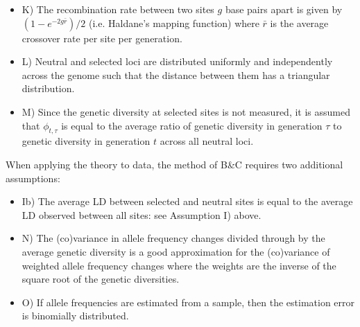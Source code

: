 \documentclass[12pt]{article}
\begin{document}
\begin{bibunit}
\begin{itemize}
\item K) The recombination rate between two sites $g$ base pairs apart is given by $(1 - e^{-2g\bar{r}})/2$ (i.e. Haldane's \citeyearpar{haldane1919map} mapping function) where $\bar{r}$ is the average crossover rate per site per generation. 

\item L) Neutral and selected loci are distributed uniformly and independently across the genome such that the distance between them has a triangular distribution. 

\item M) Since the genetic diversity at selected sites is not measured, it is assumed that $\phi_{t,\tau}$ is equal to the average ratio of genetic diversity in generation $\tau$ to genetic diversity in generation $t$ across all neutral loci.
\end{itemize}

When applying the theory to data, the method of B\&C requires two additional assumptions:

\begin{itemize}

\item Ib) The average LD between selected and neutral sites is equal to the average LD observed between all sites: see Assumption I) above.

\item N) The (co)variance in allele frequency changes divided through by the average genetic diversity is a good approximation for the (co)variance of weighted allele frequency changes where the weights are the inverse of the square root of the genetic diversities. 

\item O) If allele frequencies are estimated from a sample, then the estimation error is binomially distributed.
\end{itemize}


\end{bibunit}
\end{document}
